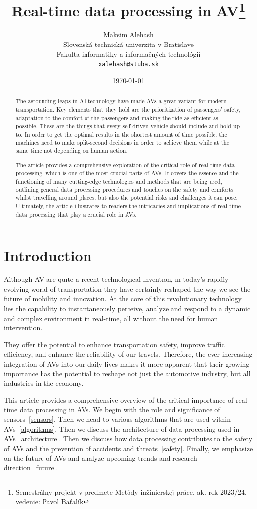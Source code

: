 \documentclass[10pt,oneside,english,a4paper]{article}
\title{Real-time data processing in AV\thanks{Semestrálny projekt v predmete Metódy inžinierskej práce, ak. rok 2023/24, vedenie: Pavol Baťalík}} %
\author{Maksim Alehash\\[2pt]
	{\small Slovenská technická univerzita v Bratislave}\\
	{\small Fakulta informatiky a informačných technológií}\\
	{\small \texttt{xalehash@stuba.sk}}
	}
\date{\small\today} %
\begin{document}
\maketitle

\begin{abstract}
The astounding leaps in AI technology have made AVs a great variant for modern transportation. Key elements that they hold are the prioritization of passengers' safety, adaptation to the comfort of the passengers and making the ride as efficient as possible. These are the things that every self-driven vehicle should include and hold up to. In order to get the optimal results in the shortest amount of time possible, the machines need to make split-second decisions in order to achieve them while at the same time not depending on human action. 
\par The article provides a comprehensive exploration of the critical role of real-time data processing, which is one of the most crucial parts of AVs. It covers the essence and the functioning of many cutting-edge technologies and methods that are being used, outlining general data processing procedures and touches on the safety and comforts whilst travelling around places, but also the potential risks and challenges it can pose. Ultimately, the article illustrates to readers the intricacies and implications of real-time data processing that play a crucial role in AVs.

\end{abstract}

\newpage\tableofcontents

\newpage\section{Introduction}

\indent Although AV are quite a recent technological invention, in today's rapidly evolving world of transportation they have certainly reshaped the way we see the future of mobility and innovation. At the core of this revolutionary technology lies the capability to instantaneously perceive, analyze and respond to a dynamic and complex environment in real-time, all without the need for human intervention. 
\par They offer the potential to enhance transportation safety, improve traffic efficiency, and enhance the reliability of our travels. Therefore, the ever-increasing integration of AVs into our daily lives makes it more apparent that their growing importance has the potential to reshape not just the automotive industry, but all industries in the economy. 
\par This article provides a comprehensive overview of the critical importance of real-time data processing in AVs. We begin with the role and significance of sensors~\eqref{sensors}. 
Then we head to various algorithms that are used within AVs~\eqref{algorithms}. Then we discuss the architecture of data processing used in AVs~\eqref{architecture}. Then we discuss how data processing contributes to the safety of AVs and the prevention of accidents and threats~\eqref{safety}. Finally, we emphasize on the future of AVs and analyze upcoming trends and research direction~\eqref{future}.
\end{document}
